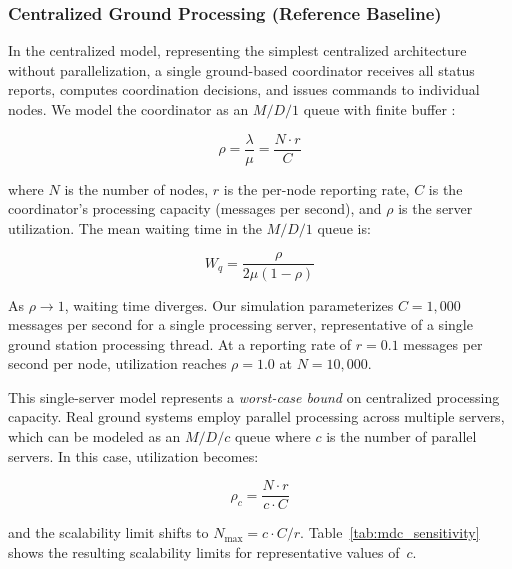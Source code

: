 \documentclass[journal]{IEEEtran}
\begin{document}
\subsubsection{Centralized Ground Processing (Reference Baseline)}

In the centralized model, representing the simplest centralized architecture without parallelization, a single ground-based coordinator receives all status reports, computes coordination decisions, and issues commands to individual nodes. We model the coordinator as an $M/D/1$ queue with finite buffer \cite{kleinrock_queueing}:

\begin{equation}
    \rho = \frac{\lambda}{\mu} = \frac{N \cdot r}{C}
    \label{eq:centralized_utilization}
\end{equation}

\noindent where $N$ is the number of nodes, $r$ is the per-node reporting rate, $C$ is the coordinator's processing capacity (messages per second), and $\rho$ is the server utilization. The mean waiting time in the $M/D/1$ queue is:

\begin{equation}
    W_q = \frac{\rho}{2\mu(1 - \rho)}
    \label{eq:md1_waiting}
\end{equation}

As $\rho \to 1$, waiting time diverges. Our simulation parameterizes $C = 1{,}000$ messages per second for a single processing server, representative of a single ground station processing thread. At a reporting rate of $r = 0.1$ messages per second per node, utilization reaches $\rho = 1.0$ at $N = 10{,}000$.

This single-server model represents a \emph{worst-case bound} on centralized processing capacity. Real ground systems employ parallel processing across multiple servers, which can be modeled as an $M/D/c$ queue where $c$ is the number of parallel servers. In this case, utilization becomes:

\begin{equation}
    \rho_c = \frac{N \cdot r}{c \cdot C}
    \label{eq:mdc_utilization}
\end{equation}

\noindent and the scalability limit shifts to $N_{\max} = c \cdot C / r$. Table~\ref{tab:mdc_sensitivity} shows the resulting scalability limits for representative values of~$c$.
\end{document}
